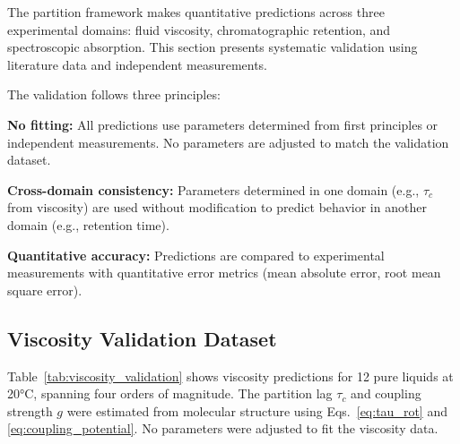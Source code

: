\documentclass[twocolumn,superscriptaddress,prb,10pt]{revtex4-2}
\begin{document}
The partition framework makes quantitative predictions across three experimental domains: fluid viscosity, chromatographic retention, and spectroscopic absorption. This section presents systematic validation using literature data and independent measurements.

The validation follows three principles:

\textbf{No fitting:} All predictions use parameters determined from first principles or independent measurements. No parameters are adjusted to match the validation dataset.

\textbf{Cross-domain consistency:} Parameters determined in one domain (e.g., $\tau_c$ from viscosity) are used without modification to predict behavior in another domain (e.g., retention time).

\textbf{Quantitative accuracy:} Predictions are compared to experimental measurements with quantitative error metrics (mean absolute error, root mean square error).

\subsection{Viscosity Validation Dataset}

Table~\ref{tab:viscosity_validation} shows viscosity predictions for 12 pure liquids at 20°C, spanning four orders of magnitude. The partition lag $\tau_c$ and coupling strength $g$ were estimated from molecular structure using Eqs.~\ref{eq:tau_rot} and \ref{eq:coupling_potential}. No parameters were adjusted to fit the viscosity data.
\end{document}
